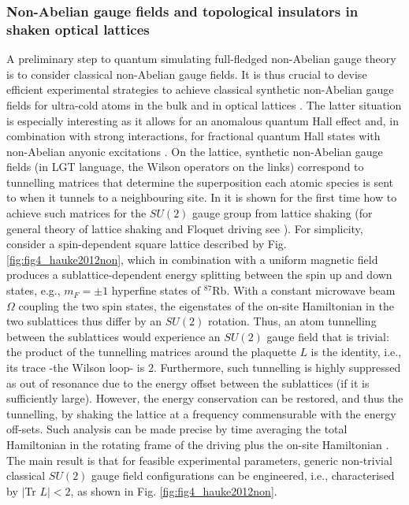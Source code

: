 \documentclass[epj,final]{svjour}
\begin{document}
\subsubsection{Non-Abelian gauge fields and topological insulators in shaken optical lattices\cite{hauke2012non}}

A preliminary step to quantum simulating full-fledged non-Abelian gauge theory is to consider classical non-Abelian gauge fields. It is thus crucial to devise efficient experimental strategies to achieve classical synthetic non-Abelian gauge fields for ultra-cold atoms in the bulk and in optical lattices \cite{hauke2012non}. The latter situation is especially interesting as it allows for an anomalous quantum Hall effect \cite{Goldman2009} and, in combination with strong interactions, for fractional quantum Hall states with non-Abelian anyonic excitations \cite{Burrello2010}. On the lattice, synthetic non-Abelian gauge fields (in LGT language, the Wilson operators on the links) correspond to tunnelling matrices that determine the superposition each atomic species is sent to when it tunnels to a neighbouring site. In \cite{hauke2012non} it is shown for the first time how to achieve such matrices for the $SU(2)$ gauge group from lattice shaking (for general theory of lattice shaking and Floquet driving see \cite{Eckardt2017}). For simplicity, consider a spin-dependent square lattice described by  Fig. \ref{fig:fig4_hauke2012non}, which in combination with a uniform magnetic field produces a sublattice-dependent energy splitting between the spin up and down states, e.g., $m_F=\pm 1$ hyperfine states of $^{87}$Rb. With a constant microwave beam $\Omega$ coupling the two spin states, the eigenstates of the on-site Hamiltonian in the two sublattices thus differ by an $SU(2)$ rotation. Thus, an atom tunnelling between the sublattices would experience an $SU(2)$ gauge field that is trivial: the product of the tunnelling matrices around the plaquette $L$ is the identity, i.e., its trace -the Wilson loop- is 2. Furthermore, such tunnelling is highly suppressed as out of resonance due to the energy offset between the sublattices (if it is sufficiently large).  However, the energy conservation can be restored, and thus the tunnelling, by shaking the lattice at a frequency commensurable with the energy off-sets. Such analysis can be made precise by time averaging the total Hamiltonian in the rotating frame of the driving plus the on-site Hamiltonian \cite{hauke2012non}. The main result is that for feasible experimental parameters, generic non-trivial classical $SU(2)$ gauge field configurations can be engineered, i.e., characterised by $|$Tr $L  |<2$, as shown in Fig. \ref{fig:fig4_hauke2012non}.
\end{document}
